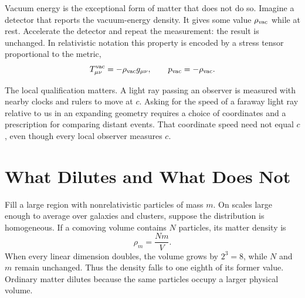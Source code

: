 Vacuum energy is the exceptional form of matter that does not do so. Imagine a detector that reports the vacuum-energy density. It gives some value \(\rho_{\rm vac}\) while at rest. Accelerate the detector and repeat the measurement: the result is unchanged. In relativistic notation this property is encoded by a stress tensor proportional to the metric,
\begin{equation}
T_{\mu\nu}^{\rm vac}=-\rho_{\rm vac}g_{\mu\nu},
\qquad
p_{\rm vac}=-\rho_{\rm vac}.
\label{eq:l08-vacuum-stress}
\end{equation}

The local qualification matters. A light ray passing an observer is measured with nearby clocks and rulers to move at \(c\). Asking for the speed of a faraway light ray relative to us in an expanding geometry requires a choice of coordinates and a prescription for comparing distant events. That coordinate speed need not equal \(c\), even though every local observer measures \(c\).

\begin{classroomqa}
\end{classroomqa}

\section{What Dilutes and What Does Not}

Fill a large region with nonrelativistic particles of mass \(m\). On scales large enough to average over galaxies and clusters, suppose the distribution is homogeneous. If a comoving volume contains \(N\) particles, its matter density is
\begin{equation}
\rho_m=\frac{Nm}{V}.
\end{equation}
When every linear dimension doubles, the volume grows by \(2^3=8\), while \(N\) and \(m\) remain unchanged. Thus the density falls to one eighth of its former value. Ordinary matter dilutes because the same particles occupy a larger physical volume.

